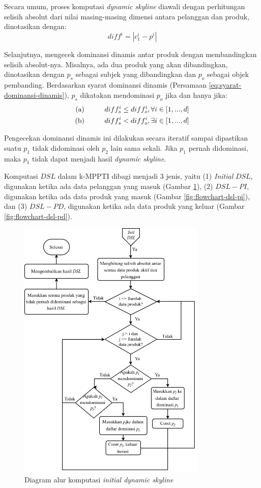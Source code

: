 Secara umum, proses komputasi \textit{dynamic skyline} diawali dengan perhitungan selisih absolut dari nilai masing-masing dimensi antara pelanggan dan produk, dinotasikan dengan:
\begin{equation}\label{eq:diff}
diff^i = |c_1^i - p^i|
\end{equation}

Selanjutnya, mengecek dominansi dinamis antar produk dengan membandingkan selisih absolut-nya. Misalnya, ada dua produk yang akan dibandingkan, dinotasikan dengan $p_s$ sebagai subjek yang dibandingkan dan $p_o$ sebagai objek pembanding. Berdasarkan syarat dominansi dinamis (Persamaan \ref{eq:syarat-dominansi-dinamis}), $p_s$ dikatakan mendominasi $p_o$ jika dan hanya jika:
\begin{equation}\label{eq:komputasi-dsl}
\begin{split}
\text{(a)} \hspace*{1cm} diff_s^i \leq diff_o^i, \forall i \in [1, ..., d] \\
\text{(b)} \hspace*{1cm} diff_s^i < diff_o^i, \exists i \in [1, ..., d]
\end{split}
\end{equation}

Pengecekan dominansi dinamis ini dilakukan secara iteratif sampai dipastikan suatu $p_1$ tidak didominasi oleh $p_2$ lain sama sekali. Jika $p_1$ pernah didominasi, maka $p_1$ tidak dapat menjadi hasil \textit{dynamic skyline}.

Komputasi $DSL$ dalam k-MPPTI dibagi menjadi 3 jenis, yaitu (1) \textit{Initial} $DSL$, digunakan ketika ada data pelanggan yang masuk (Gambar \ref{fig:flowchart-dsl-init}), (2) $DSL-PI$, digunakan ketika ada data produk yang masuk (Gambar \ref{fig:flowchart-dsl-pi}), dan (3) $DSL-PD$, digunakan ketika ada data produk yang keluar (Gambar \ref{fig:flowchart-dsl-pd}).

\begin{figure}[H]
	\centering
	\includegraphics[width=9cm]{assets/img/bab3/flowchart-dsl-init.png}
	\caption{Diagram alur komputasi \textit{initial dynamic skyline}}
	\label{fig:flowchart-dsl-init}
\end{figure}

